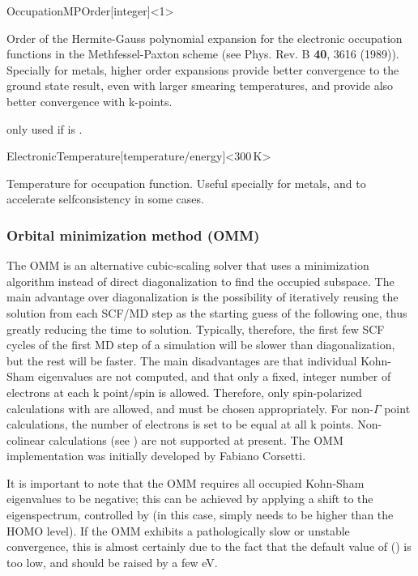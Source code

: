 \begin{fdfentry}{OccupationMPOrder}[integer]<1>
  
  Order of the Hermite-Gauss polynomial expansion for the electronic
  occupation functions in the Methfessel-Paxton scheme (see
  Phys. Rev. B \textbf{40}, 3616 (1989)).  Specially for metals,
  higher order expansions provide better convergence to the ground
  state result, even with larger smearing temperatures, and provide
  also better convergence with k-points.

  \note only used if  is .

\end{fdfentry}


\begin{fdfentry}{ElectronicTemperature}[temperature/energy]<$300\,\mathrm{K}$>
  
  Temperature for occupation function. Useful specially for metals,
  and to accelerate selfconsistency in some cases.

\end{fdfentry}



\subsubsection{Orbital minimization method (OMM)}
\label{SolverOMM}

The OMM is an alternative cubic-scaling solver that uses a
minimization algorithm instead of direct diagonalization to find the
occupied subspace.  The main advantage over diagonalization is the
possibility of iteratively reusing the solution from each SCF/MD step
as the starting guess of the following one, thus greatly reducing the
time to solution. Typically, therefore, the first few SCF cycles of
the first MD step of a simulation will be slower than diagonalization,
but the rest will be faster. The main disadvantages are that
individual Kohn-Sham eigenvalues are not computed, and that only a
fixed, integer number of electrons at each k point/spin is
allowed. Therefore, only spin-polarized calculations with
 are allowed, and  must be chosen
appropriately. For non-$\Gamma$ point calculations, the number of
electrons is set to be equal at all k points. Non-colinear
calculations (see ) are not supported at present.
The OMM implementation was initially developed by Fabiano Corsetti.

It is important to note that the OMM requires all occupied Kohn-Sham
eigenvalues to be negative; this can be achieved by applying a shift
to the eigenspectrum, controlled by  (in this case,
 simply needs to be higher than the HOMO level). If the
OMM exhibits a pathologically slow or unstable convergence, this is
almost certainly due to the fact that the default value of
 () is too low, and should be raised by
a few eV.

